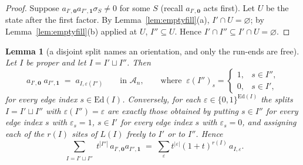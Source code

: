 \documentclass[11pt]{article}
\theoremstyle{plain}
\newtheorem{lemma}[theorem]{Lemma}
\theoremstyle{definition}
\newcommand{\A}{\mathscr{A}}
\begin{document}
\begin{proof}
Suppose $a_{I',\mathbf 0}a_{I'',\mathbf 1}\sigma_S\ne0$ for some $S$ (recall
$a_{I',\mathbf 0}$ acts first).  Let $U$ be the state after the first factor.
By Lemma~\ref{lem:emptyfill}(a), $I'\cap U=\varnothing$; by
Lemma~\ref{lem:emptyfill}(b) applied at $U$, $I''\subseteq U$.  Hence
$I'\cap I''\subseteq I'\cap U=\varnothing$.
\end{proof}

\begin{lemma}[a disjoint split names an orientation, and only the run-ends are
free]\label{lem:split}
Let $I$ be proper and let $I=I'\sqcup I''$.  Then
\[
a_{I',\mathbf 0}\;a_{I'',\mathbf 1}\;=\;a_{I,\varepsilon(I'')}
\qquad\text{in }\A_n,
\qquad\text{where }\ \varepsilon(I'')_s=\begin{cases}1,&s\in I'',\\0,&s\in I',\end{cases}
\]
for every edge index $s\in\mathrm{Ed}(I)$.  Conversely, for each
$\varepsilon\in\{0,1\}^{\mathrm{Ed}(I)}$ the splits $I=I'\sqcup I''$ with
$\varepsilon(I'')=\varepsilon$ are exactly those obtained by putting
$s\in I''$ for every edge index $s$ with $\varepsilon_s=1$, $s\in I'$ for every
edge index $s$ with $\varepsilon_s=0$, and assigning each of the $r(I)$ sites of
$L(I)$ freely to $I'$ or to $I''$.  Hence
\begin{equation}\label{eq:twochoices}
\sum_{\substack{I=I'\sqcup I''}}t^{|I''|}\,a_{I',\mathbf 0}a_{I'',\mathbf 1}
\;=\;\sum_{\varepsilon}t^{|\varepsilon|}(1+t)^{r(I)}\,a_{I,\varepsilon}.
\end{equation}
\end{lemma}
\end{document}
